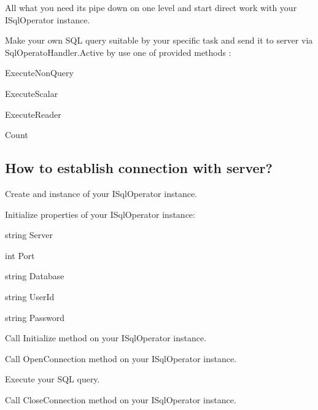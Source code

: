 All what you need it\textquotesingle{}s pipe down on one level and start direct work with your {\ttfamily I\+Sql\+Operator} instance.

Make your own S\+QL query suitable by your specific task and send it to server via {\ttfamily Sql\+Operato\+Handler.\+Active} by use one of provided methods \+:
\begin{DoxyItemize}
\item {\ttfamily Execute\+Non\+Query}
\item {\ttfamily Execute\+Scalar}
\item {\ttfamily Execute\+Reader}
\item {\ttfamily Count}
\end{DoxyItemize}

\subsection*{How to establish connection with server?}


\begin{DoxyEnumerate}
\item Create and instance of your {\ttfamily I\+Sql\+Operator} instance.
\item Initialize properties of your {\ttfamily I\+Sql\+Operator} instance\+:
\begin{DoxyItemize}
\item {\ttfamily string Server}
\item {\ttfamily int Port}
\item {\ttfamily string Database}
\item {\ttfamily string User\+Id}
\item {\ttfamily string Password}
\end{DoxyItemize}
\item Call {\ttfamily Initialize} method on your {\ttfamily I\+Sql\+Operator} instance.
\item Call {\ttfamily Open\+Connection} method on your {\ttfamily I\+Sql\+Operator} instance.
\item Execute your S\+QL query.
\item Call {\ttfamily Close\+Connection} method on your {\ttfamily I\+Sql\+Operator} instance. 
\end{DoxyEnumerate}